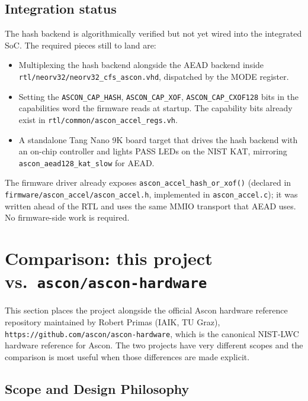 \documentclass[11pt,a4paper]{article}
\begin{document}
\subsection{Integration status}

The hash backend is algorithmically verified but not yet wired into
the integrated SoC. The required pieces still to land are:

\begin{itemize}[noitemsep]
  \item Multiplexing the hash backend alongside the AEAD backend
        inside \texttt{rtl/neorv32/neorv32\_cfs\_ascon.vhd}, dispatched
        by the MODE register.
  \item Setting the \texttt{ASCON\_CAP\_HASH}, \texttt{ASCON\_CAP\_XOF},
        \texttt{ASCON\_CAP\_CXOF128} bits in the capabilities word
        the firmware reads at startup. The capability bits already
        exist in \texttt{rtl/common/ascon\_accel\_regs.vh}.
  \item A standalone Tang Nano 9K board target that drives the hash
        backend with an on-chip controller and lights PASS LEDs on
        the NIST KAT, mirroring \texttt{ascon\_aead128\_kat\_slow}
        for AEAD.
\end{itemize}

The firmware driver already exposes
\texttt{ascon\_accel\_hash\_or\_xof()} (declared in
\texttt{firmware/ascon\_accel/ascon\_accel.h}, implemented in
\texttt{ascon\_accel.c}); it was written ahead of the RTL and uses
the same MMIO transport that AEAD uses. No firmware-side work is
required.

\section{Comparison: this project vs.\ \texttt{ascon/ascon-hardware}}
\label{sec:compare}

This section places the project alongside the official Ascon hardware
reference repository maintained by Robert Primas (IAIK, TU Graz),
\texttt{https://github.com/ascon/ascon-hardware}, which is the
canonical NIST-LWC hardware reference for Ascon. The two projects have
very different scopes and the comparison is most useful when those
differences are made explicit.

\subsection{Scope and Design Philosophy}
\end{document}
